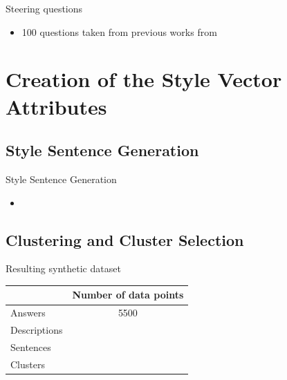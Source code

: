 \documentclass[t]{beamer}
\begin{document}
\begin{frame}{Steering questions}
  \begin{itemize}
    \item 100 questions taken from previous works from \citet{petroni-etal-2021-kilt,rooeinKnowYourAudience2023}
  \end{itemize}
\end{frame}


\section{Creation of the Style Vector Attributes}
\subsection{Style Sentence Generation}
\begin{frame}{Style Sentence Generation}
  \begin{itemize}
    \item
  \end{itemize}
\end{frame}

\begin{frame}[shrink]
  
\end{frame}
\begin{frame}[shrink]
  
\end{frame}

\subsection{Clustering and Cluster Selection}
\begin{frame}{}

\end{frame}

\begin{frame}{Resulting synthetic dataset}

  \begin{tabular}{lS}
    \toprule
                 & {Number of data points} \\ \midrule
    Answers      & 5500                    \\
    Descriptions &                         \\
    Sentences    &                         \\
    Clusters     &                         \\ \bottomrule
  \end{tabular}

\end{frame}
\end{document}

